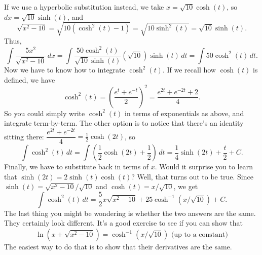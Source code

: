 \documentclass[12pt]{article}
\begin{document}
\begin{enumerate}
 \bigskip
 
 If we use a hyperbolic substitution instead, we take $x=\sqrt{10}\cosh(t)$, so $dx = \sqrt{10}\sinh(t)$, and
 \[
 \sqrt{x^2-10} = \sqrt{10(\cosh^2(t)-1)} = \sqrt{10\sinh^2(t)} = \sqrt{10}\sinh(t).
 \]
 Thus,
 \[
 \int \frac{5x^2}{\sqrt{x^2-10}}\,dx = \int \frac{50\cosh^2(t)}{\sqrt{10}\sinh(t)}(\sqrt{10})\sinh(t)\,dt = \int 50\cosh^2(t)\,dt.
 \]
 Now we have to know how to integrate $\cosh^2(t)$. If we recall how $\cosh(t)$ is defined, we have
 \[
 \cosh^2(t) = \left(\frac{e^t+e^{-t}}{2}\right)^2 = \frac{e^{2t}+e^{-2t}+2}{4}.
 \]
 So you could simply write $\cosh^2(t)$ in terms of exponentials as above, and integrate term-by-term. The other option is to notice that there's an identity sitting there: $\dfrac{e^{2t}+e^{-2t}}{4} = \frac{1}{2}\cosh(2t)$, so
 \[
 \int \cosh^2(t)\,dt = \int\left( \frac{1}{2}\cosh(2t)+\frac{1}{2}\right)\,dt = \frac{1}{4}\sinh(2t)+\frac{t}{2}+C.
 \]
 Finally, we have to substitute back in terms of $x$. Would it surprise you to learn that $\sinh(2t)=2\sinh(t)\cosh(t)$? Well, that turns out to be true. Since $\sinh(t) = \sqrt{x^2-10}/\sqrt{10}$ and $\cosh(t) = x/\sqrt{10}$, we get
 \[
 \int\cosh^2(t)\,dt = \frac{5}{2}x\sqrt{x^2-10}+25\cosh^{-1}(x/\sqrt{10})+C.
 \]
 The last thing you might be wondering is whether the two answers are the same. They certainly look different. It's a good exercise to see if you can show that
 \[
 \ln(x+\sqrt{x^2-10}) = \cosh^{-1}(x/\sqrt{10}) \text{ (up to a constant)}
 \]
 The easiest way to do that is to show that their derivatives are the same.
 

 \end{enumerate}
\end{document}
